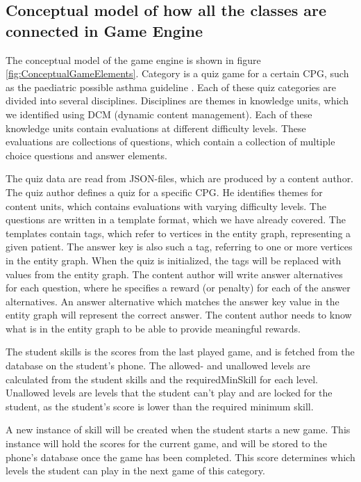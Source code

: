 \subsection{Conceptual model of how all the classes are connected in Game Engine}
The conceptual model of the game engine is shown in figure \ref{fig:ConceptualGameElements}. Category is a quiz game for a certain CPG, such as the paediatric possible asthma guideline \parencite{RepublicofKeny2016}. Each of these quiz categories are divided into several disciplines. Disciplines are themes in knowledge units, which we identified using DCM (dynamic content management). Each of these knowledge units contain evaluations at different difficulty levels. These evaluations are collections of questions, which contain a collection of multiple choice questions and answer elements.

The quiz data are read from JSON-files, which are produced by a content author. The quiz author defines a quiz for a specific CPG. He identifies themes for content units, which contains evaluations with varying difficulty levels. The questions are written in a template format, which we have already covered. The templates contain tags, which refer to vertices in the entity graph, representing a given patient. The answer key is also such a tag, referring to one or more vertices in the entity graph. When the quiz is initialized, the tags will be replaced with values from the entity graph. The content author will write answer alternatives for each question, where he specifies a reward (or penalty) for each of the answer alternatives. An answer alternative which matches the answer key value in the entity graph will represent the correct answer. The content author needs to know what is in the entity graph to be able to provide meaningful rewards.

The student skills is the scores from the last played game, and is fetched from the database on the student's phone. The allowed- and unallowed levels are calculated from the student skills and the requiredMinSkill for each level. Unallowed levels are levels that the student can't play and are locked for the student, as the student's score is lower than the required minimum skill.

A new instance of skill will be created when the student starts a new game. This instance will hold the scores for the current game, and will be stored to the phone's database once the game has been completed. This score determines which levels the student can play in the next game of this category.


